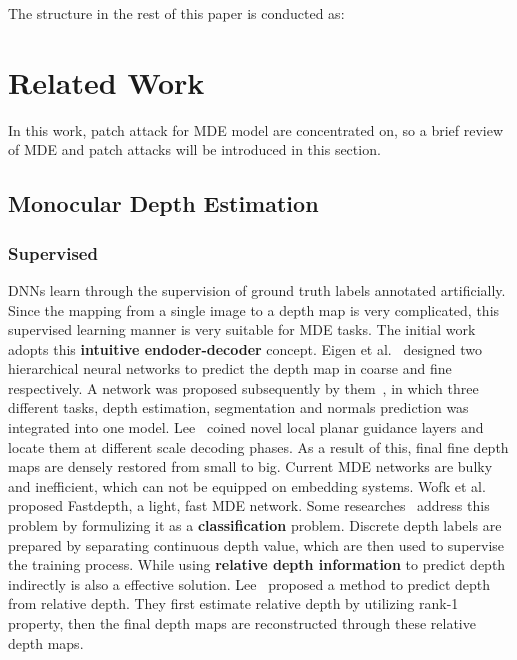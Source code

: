 \documentclass[10pt,twocolumn,letterpaper]{article}
\begin{document}
The structure in the rest of this paper is conducted as:

\section{Related Work}
In this work, patch attack for MDE model are concentrated on, 
so a brief review of MDE and patch attacks will be 
introduced in this section.

\subsection{Monocular Depth Estimation}
\subsubsection{Supervised}
DNNs learn through the supervision of ground truth labels 
annotated artificially. Since the mapping from a single image 
to a depth map is very complicated, this supervised learning 
manner is very suitable for MDE tasks. The initial work adopts 
this \textbf{intuitive endoder-decoder} concept. 
Eigen et al.~\cite{Eigen_2014_nips} designed two hierarchical 
neural networks to predict 
the depth map in coarse and fine respectively.
A network was proposed subsequently by them~\cite{Eigen_2015_ICCV}, 
in which three 
different tasks, depth estimation, segmentation and 
normals prediction was integrated into one model.
Lee~\cite{lee_2019_arxiv} coined novel local planar 
guidance layers and locate 
them at different scale decoding phases. 
As a result of this, final fine depth maps are densely 
restored from small to big.
Current MDE networks are bulky and inefficient, which can not
be equipped on embedding systems. Wofk et al.~\cite{Wofk_2019_ICRA} 
proposed Fastdepth,
a light, fast MDE network.
Some researches~\cite{Li_2018_ACCV,cao_2017_CSVT,Fu_2018_CVPR} 
address this problem by formulizing it as 
a \textbf{classification} problem. 
Discrete depth labels are prepared by separating 
continuous depth value, which are then used to supervise 
the training process.
While using \textbf{relative depth information} to predict depth 
indirectly is also a effective solution.
Lee~\cite{Lee_2019_CVPR} proposed a method to predict depth from relative depth. 
They first estimate relative depth by utilizing rank-1 property, 
then the final depth maps are reconstructed through these relative 
depth maps.
\end{document}
